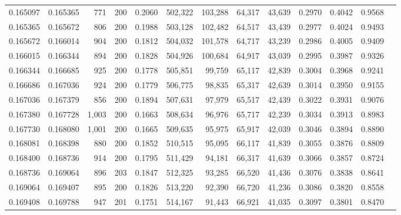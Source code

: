 \begin{tabular}{rrrrrrrrrrrrr}
0.165097 & 0.165365 &    771 & 200 &                                     0.2060 & 502,322 & 103,288 &  64,317 &  43,639 & 0.2970 & 0.4042 & 0.9568 \\
0.165365 & 0.165672 &    806 & 200 &                                     0.1988 & 503,128 & 102,482 &  64,517 &  43,439 & 0.2977 & 0.4024 & 0.9493 \\
0.165672 & 0.166014 &    904 & 200 &                                     0.1812 & 504,032 & 101,578 &  64,717 &  43,239 & 0.2986 & 0.4005 & 0.9409 \\
0.166015 & 0.166344 &    894 & 200 &                                     0.1828 & 504,926 & 100,684 &  64,917 &  43,039 & 0.2995 & 0.3987 & 0.9326 \\
0.166344 & 0.166685 &    925 & 200 &                                     0.1778 & 505,851 &  99,759 &  65,117 &  42,839 & 0.3004 & 0.3968 & 0.9241 \\
0.166686 & 0.167036 &    924 & 200 &                                     0.1779 & 506,775 &  98,835 &  65,317 &  42,639 & 0.3014 & 0.3950 & 0.9155 \\
0.167036 & 0.167379 &    856 & 200 &                                     0.1894 & 507,631 &  97,979 &  65,517 &  42,439 & 0.3022 & 0.3931 & 0.9076 \\
0.167380 & 0.167728 &  1,003 & 200 &                                     0.1663 & 508,634 &  96,976 &  65,717 &  42,239 & 0.3034 & 0.3913 & 0.8983 \\
0.167730 & 0.168080 &  1,001 & 200 &                                     0.1665 & 509,635 &  95,975 &  65,917 &  42,039 & 0.3046 & 0.3894 & 0.8890 \\
0.168081 & 0.168398 &    880 & 200 &                                     0.1852 & 510,515 &  95,095 &  66,117 &  41,839 & 0.3055 & 0.3876 & 0.8809 \\
0.168400 & 0.168736 &    914 & 200 &                                     0.1795 & 511,429 &  94,181 &  66,317 &  41,639 & 0.3066 & 0.3857 & 0.8724 \\
0.168736 & 0.169064 &    896 & 203 &                                     0.1847 & 512,325 &  93,285 &  66,520 &  41,436 & 0.3076 & 0.3838 & 0.8641 \\
0.169064 & 0.169407 &    895 & 200 &                                     0.1826 & 513,220 &  92,390 &  66,720 &  41,236 & 0.3086 & 0.3820 & 0.8558 \\
0.169408 & 0.169788 &    947 & 201 &                                     0.1751 & 514,167 &  91,443 &  66,921 &  41,035 & 0.3097 & 0.3801 & 0.8470 \\

\end{tabular}

